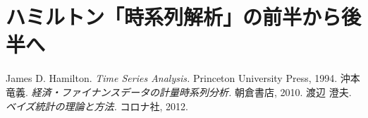 \documentclass[b5paper,xelatex,ja=standard,10pt]{bxjsarticle}
\begin{document}


\part*{ハミルトン「時系列解析」の前半から後半へ}

\begin{spacing}{0.5}
\tableofcontents
\end{spacing}

\begin{thebibliography}{99}
     James D. Hamilton. \textit{Time Series Analysis.} Princeton University Press, 1994.
     沖本 竜義. \textit{経済・ファイナンスデータの計量時系列分析.} 朝倉書店, 2010.
     渡辺 澄夫. \textit{ベイズ統計の理論と方法.} コロナ社, 2012.
\end{thebibliography}
\vspace{3pt}
\end{document}
